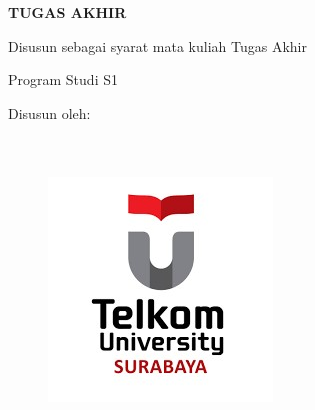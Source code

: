 
\begin{titlepage}
    \begin{center}      
        \bo{\Judul} \\[0.55cm]
        
        \vspace*{1 cm}
        \textit{\bo{\JudulInggris}} \\[1.5cm]

        \vspace*{0.05 cm}    
        \textbf{TUGAS AKHIR}
        
        \vspace*{1 cm}
        
Disusun sebagai syarat mata kuliah Tugas Akhir

Program Studi S1 \program

        \vspace*{1 cm}       
        Disusun oleh:\\
        \bo{\Penulis} \\
        \bo{\nim} \\

        \vspace*{1.0cm}
        
        \begin{figure}
            \begin{center}
                \includegraphics[scale=0.9]{pics/pengantar/TelUSBY.jpg}
            \end{center}
        \end{figure}
        \vspace*{1.0cm}
    \end{center}
\end{titlepage}

